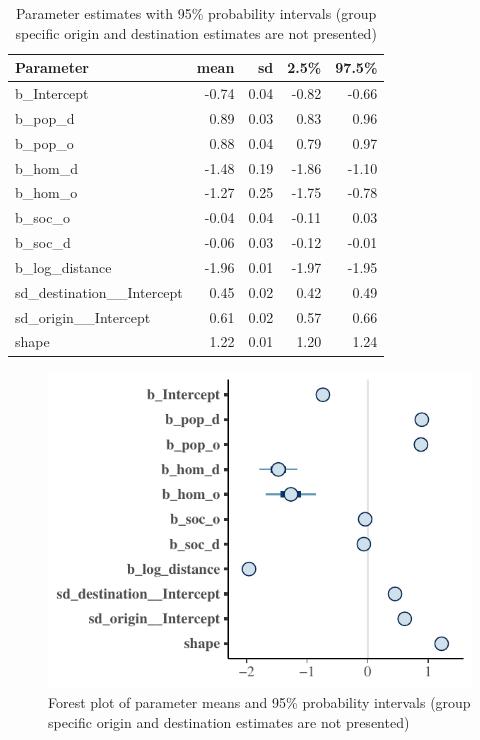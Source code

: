 \documentclass[fleqn,10pt]{SelfArx} %
\begin{document}
{{%
\begin{table}[ht]
  \centering
  \caption{Parameter estimates with 95\% probability intervals (group specific origin and destination estimates are not presented)}
  \label{tab:coef}
  \begin{tabular}{lrrrr}
    \toprule
    Parameter & mean & sd & 2.5\% & 97.5\% \\ 
    \midrule
    b\_Intercept & -0.74 & 0.04 & -0.82 & -0.66 \\ 
    b\_pop\_d & 0.89 & 0.03 & 0.83 & 0.96 \\ 
    b\_pop\_o & 0.88 & 0.04 & 0.79 & 0.97 \\ 
    b\_hom\_d & -1.48 & 0.19 & -1.86 & -1.10 \\ 
    b\_hom\_o & -1.27 & 0.25 & -1.75 & -0.78 \\ 
    b\_soc\_o & -0.04 & 0.04 & -0.11 & 0.03 \\ 
    b\_soc\_d & -0.06 & 0.03 & -0.12 & -0.01 \\ 
    b\_log\_distance & -1.96 & 0.01 & -1.97 & -1.95 \\ 
    sd\_destination\_\_Intercept & 0.45 & 0.02 & 0.42 & 0.49 \\ 
    sd\_origin\_\_Intercept & 0.61 & 0.02 & 0.57 & 0.66 \\ 
    shape & 1.22 & 0.01 & 1.20 & 1.24 \\ 
    \bottomrule
  \end{tabular}
\end{table}

\begin{figure}
  \includegraphics[width = \columnwidth]{../fig/forestplot.pdf}
  \caption{Forest plot of parameter means and 95\% probability
    intervals (group specific origin and destination estimates are not
    presented)}
  \label{fig:forestplot}
\end{figure}

}}
\end{document}
